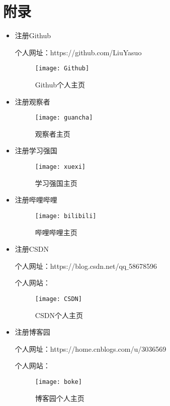 \documentclass{article}
\begin{document}
\section{附录}
\begin{itemize}
    \item 注册Github\par
    个人网址：https://github.com/LiuYasuo
    \begin{figure}[h!]
    \centering
    \texttt{[image: Github]}
    \caption{Github个人主页}
    \label{fig:Github}
    \end{figure}
    
    
    
    \item 注册观察者
    \begin{figure}[h!]
    \centering
    \texttt{[image: guancha]}
    \caption{观察者主页}
    \label{fig:guancha}
    \end{figure}
    
    \item 注册学习强国
    \begin{figure}[h!]
    \centering
    \texttt{[image: xuexi]}
    \caption{学习强国主页}
    \label{fig:xuexi}
    \end{figure}
    
     \item 注册哔哩哔哩
    \begin{figure}[h!]
    \centering
    \texttt{[image: bilibili]}
    \caption{哔哩哔哩主页}
    \label{fig:bilibili}
    \end{figure}
    
    \item 注册CSDN\par
    个人网址：https://blog.csdn.net/qq$\_$58678596\par
    个人网站：
    
    \begin{figure}[h!]
    \centering
    \texttt{[image: CSDN]}
    \caption{CSDN个人主页}
    \label{fig:CSDN}
    \end{figure}
    
    \item 注册博客园\par
    个人网址：https://home.cnblogs.com/u/3036569\par
    个人网站：
    
    \begin{figure}[h!]
    \centering
    \texttt{[image: boke]}
    \caption{博客园个人主页}
    \label{fig:boke}
    \end{figure}
    

\end{itemize}
\end{document}
